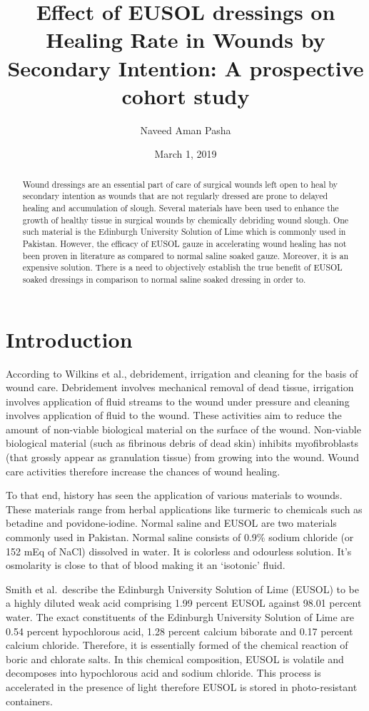 \documentclass{article}
\title{Effect of EUSOL dressings on Healing Rate in Wounds by Secondary Intention: A prospective cohort study}
\author{Naveed Aman Pasha}
\date{March 1, 2019}
\begin{document}
\maketitle

\begin{abstract}
Wound dressings are an essential part of care of surgical wounds left open to
heal by secondary intention as wounds that are not regularly dressed are prone
to delayed healing and accumulation of slough. Several materials have been used
to enhance the growth of healthy tissue in surgical wounds by chemically
debriding wound slough. One such material is the Edinburgh University Solution
of Lime which is commonly used in Pakistan. However, the efficacy of EUSOL gauze
in accelerating wound healing has not been proven in literature as compared to
normal saline soaked gauze. Moreover, it is an expensive solution. There is a
need to objectively establish the true benefit of EUSOL soaked dressings in
comparison to normal saline soaked dressing in order to.
\end{abstract}

\section{Introduction}
According to Wilkins et al., debridement, irrigation and cleaning for the
basis of wound care. Debridement involves mechanical removal of dead tissue,
irrigation involves application of fluid streams to the wound under pressure and
cleaning involves application of fluid to the wound.\cite{Wilkins_2013} These
activities aim to reduce the amount of non-viable biological material on the
surface of the wound. Non-viable biological material (such as fibrinous debris
of dead skin) inhibits myofibroblasts (that grossly appear as granulation
tissue) from growing into the wound. Wound care activities therefore increase
the chances of wound healing.

To that end, history has seen the application of various materials to wounds.
These materials range from herbal applications like turmeric to chemicals such
as betadine and povidone-iodine. Normal saline and EUSOL are two materials
commonly used in Pakistan. Normal saline consists of 0.9\% sodium chloride (or
152 mEq of NaCl) dissolved in water. It is colorless and odourless solution.
It's osmolarity is close to that of blood making it an `isotonic' fluid.

Smith et al.\ describe the Edinburgh University Solution of Lime (EUSOL) to be a
highly diluted weak acid comprising 1.99 percent EUSOL against 98.01 percent
water. The exact constituents of the Edinburgh University Solution of Lime are
0.54 percent hypochlorous acid, 1.28 percent calcium biborate and 0.17 percent
calcium chloride. Therefore, it is essentially formed of the chemical reaction
of boric and chlorate salts. In this chemical composition, EUSOL is volatile and
decomposes into hypochlorous acid and sodium chloride. This process is
accelerated in the presence of light therefore EUSOL is stored in
photo-resistant containers.\cite{Smith_1915}
\end{document}
